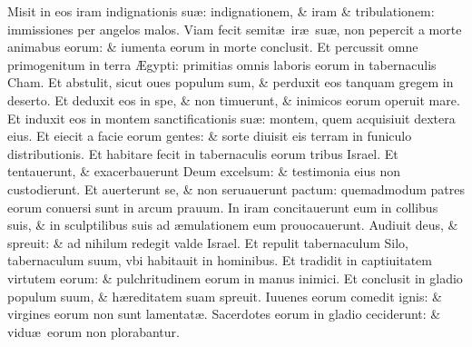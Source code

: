 \documentclass[a5paper,10pt]{book}
\def\ae{æ}
\def\AE{Æ}
\begin{document}
\begin{multicols*}{2}
\newline \color{red} M\color{black}isit in eos iram indignationis su\ae : indignationem, \& iram \& tribulationem: immissiones per angelos malos.
\newline \color{red} V\color{black}iam fecit semit\ae \ ir\ae \ su\ae , non pepercit a morte animabus eorum: \& iumenta eorum in morte conclusit.
\newline \color{red} E\color{black}t percussit omne primogenitum in terra \AE gypti: primitias omnis laboris eorum in tabernaculis Cham.
\newline \color{red} E\color{black}t abstulit, sicut oues populum sum, \& perduxit eos tanquam gregem in deserto.%
\newline \color{red} E\color{black}t deduxit eos in spe, \& non timuerunt, \& inimicos eorum operuit mare.
\newline \color{red} E\color{black}t induxit eos in montem sanctificationis su\ae : montem, quem acquisiuit dextera eius.
\newline \color{red} E\color{black}t eiecit a facie eorum gentes: \& sorte diuisit eis terram in funiculo distributionis.
\newline \color{red} E\color{black}t habitare fecit in tabernaculis eorum tribus Israel.
\newline \color{red} E\color{black}t tentauerunt, \& exacerbauerunt Deum excelsum: \& testimonia eius non custodierunt.
\newline \color{red} E\color{black}t auerterunt se, \& non seruauerunt pactum: quemadmodum patres eorum conuersi sunt in arcum prauum.
\newline \color{red} I\color{black}n iram concitauerunt eum in collibus suis, \& in sculptilibus suis ad \ae mulationem eum prouocauerunt.
\newline \color{red} A\color{black}udiuit deus, \& spreuit: \& ad nihilum redegit valde Israel.
\newline \color{red} E\color{black}t repulit tabernaculum Silo, tabernaculum suum, vbi habitauit in hominibus.
\newline \color{red} E\color{black}t tradidit in captiuitatem virtutem eorum: \& pulchritudinem eorum in manus inimici.
\newline \color{red} E\color{black}t conclusit in gladio populum suum, \& h\ae reditatem suam spreuit.
\newline \color{red} I\color{black}uuenes eorum comedit ignis: \& virgines eorum non sunt lamentat\ae .
\newline \color{red} S\color{black}acerdotes eorum in gladio ceciderunt: \& vidu\ae \ eorum non plorabantur.

\end{multicols*}
\end{document}
